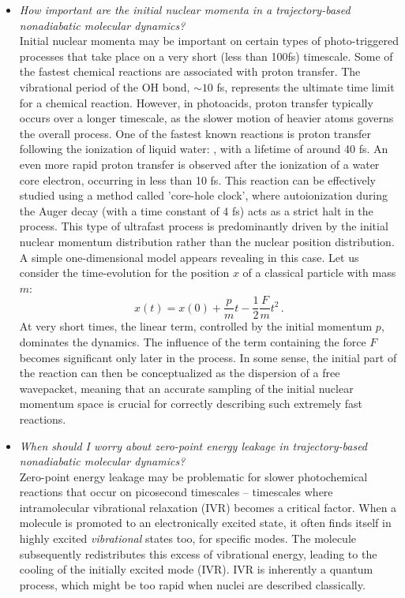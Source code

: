 \documentclass[9pt,bestpractices,pubversion]{livecoms}
\begin{document}
\begin{itemize}
\item{\textit{How important are the initial nuclear momenta in a trajectory-based nonadiabatic molecular dynamics?} \\
Initial nuclear momenta may be important on certain types of photo-triggered processes that take place on a very short (less than 100fs) timescale. Some of the fastest chemical reactions are associated with proton transfer. The vibrational period of the OH bond, $\sim10$ fs, represents the ultimate time limit for a chemical reaction. However, in photoacids, proton transfer typically occurs over a longer timescale, as the slower motion of heavier atoms governs the overall process. One of the fastest known reactions is proton transfer following the ionization of liquid water: , with a lifetime of around 40 fs.\cite{schnorr2023direct} An even more rapid proton transfer is observed after the ionization of a water core electron, occurring in less than 10 fs.\cite{stia2010theoretical} This reaction can be effectively studied using a method called 'core-hole clock', where autoionization during the Auger decay (with a time constant of 4 fs) acts as a strict halt in the process. This type of ultrafast process is predominantly driven by the initial nuclear momentum distribution rather than the nuclear position distribution. A simple one-dimensional model appears revealing in this case. Let us consider the time-evolution for the position $x$ of a classical particle with mass $m$:
\begin{equation*}
x(t)=x(0) + \frac{p}{m}t - \frac{1}{2} \frac{F}{m} t^2 \, .
\end{equation*}
At very short times, the linear term, controlled by the initial momentum $p$, dominates the dynamics. The influence of the term containing the force $F$ becomes significant only later in the process. In some sense, the initial part of the reaction can then be conceptualized as the dispersion of a free wavepacket, meaning that an accurate sampling of the initial nuclear momentum space is crucial for correctly describing such extremely fast reactions. 
}

\item{\textit{When should I worry about zero-point energy leakage in trajectory-based nonadiabatic molecular dynamics?} \\
Zero-point energy leakage may be problematic for slower photochemical reactions that occur on picosecond timescales -- timescales where intramolecular vibrational relaxation (IVR) becomes a critical factor. When a molecule is promoted to an electronically excited state, it often finds itself in highly excited \textit{vibrational} states too, for specific modes. The molecule subsequently redistributes this excess of vibrational energy, leading to the cooling of the initially excited mode (IVR).\cite{Karmakar2020IVR} IVR is inherently a quantum process, which might be too rapid when nuclei are described classically.

}
\end{itemize}
\end{document}
